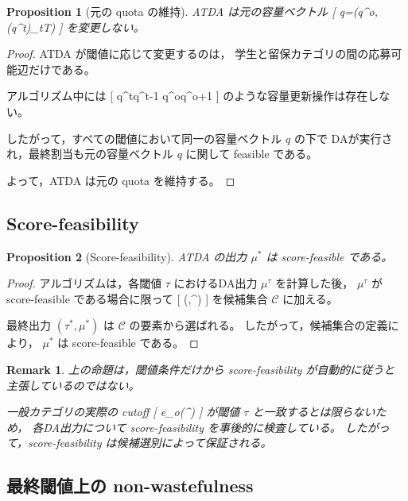 \documentclass[
  12pt,
  a4paper,
  oneside,
  onecolumn,
  titlepage,
  final
]{jsarticle}
\newtheorem{proposition}{Proposition}
\newtheorem{remark}{Remark}
\newcommand{\1}{\mathbf{1}}
\begin{document}
\begin{proposition}[元の quota の維持]
\label{prop}
\textsc{ATDA} は元の容量ベクトル
[
q=(q^o,(q^t)_{t\in T})
]
を変更しない。
\end{proposition}

\begin{proof}
\textsc{ATDA} が閾値に応じて変更するのは，
学生と留保カテゴリの間の応募可能辺だけである。

アルゴリズム中には
[
q^t\leftarrow q^t-1
\qquad{}\qquad
q^o\leftarrow q^o+1
]
のような容量更新操作は存在しない。

したがって，すべての閾値において同一の容量ベクトル $q$ の下で
DAが実行され，最終割当も元の容量ベクトル $q$ に関して
feasible である。

よって，\textsc{ATDA} は元の quota を維持する。
\end{proof}

\subsection{Score-feasibility}

\begin{proposition}[Score-feasibility]
\label{prop}
\textsc{ATDA} の出力 $\mu^\ast$ は score-feasible である。
\end{proposition}

\begin{proof}
アルゴリズムは，各閾値 $\tau$ におけるDA出力 $\mu^\tau$ を計算した後，
$\mu^\tau$ が score-feasible である場合に限って
[
(\tau,\mu^\tau)
]
を候補集合 $\mathcal C$ に加える。

最終出力 $(\tau^\ast,\mu^\ast)$ は
$\mathcal C$ の要素から選ばれる。
したがって，候補集合の定義により，
$\mu^\ast$ は score-feasible である。
\end{proof}

\begin{remark}
上の命題は，閾値条件だけから score-feasibility が自動的に従うと
主張しているのではない。

一般カテゴリの実際の cutoff
[
e_o(\mu^\tau)
]
が閾値 $\tau$ と一致するとは限らないため，
各DA出力について score-feasibility を事後的に検査している。
したがって，score-feasibility は候補選別によって保証される。
\end{remark}

\subsection{最終閾値上の non-wastefulness}
\end{document}
